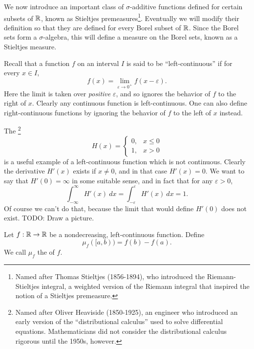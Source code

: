 \begin{subsec}
We now introduce an important class of $\sigma$-additive functions defined for certain subsets of $\mathbb{R}$, known as Stieltjes premeasures\footnote{Named after Thomas Stieltjes (1856-1894), who introduced the Riemann-Stieltjes integral, a weighted version of the Riemann integral that inspired the notion of a Stieltjes premeasure.}.
Eventually we will modify their definition so that they are defined for every Borel subset of $\mathbb{R}$.
Since the Borel sets form a $\sigma$-algebra, this will define a measure on the Borel sets, known as a Stieltjes measure.
\end{subsec}

\begin{subsec}
Recall that a function $f$ on an interval $I$ is said to be ``left-continuous'' if for every $x \in I$,
\[f(x) = \lim_{\varepsilon \to 0^+} f(x - \varepsilon).\]
Here the limit is taken over \emph{positive} $\varepsilon$, and so ignores the behavior of $f$ to the right of $x$.
Clearly any continuous function is left-continuous.
One can also define right-continuous functions by ignoring the behavior of $f$ to the left of $x$ instead.
\end{subsec}

\begin{example}
The \footnote{Named after Oliver Heaviside (1850-1925), an engineer who introduced an early version of the ``distributional calculus'' used to solve differential equations. Mathematicians did not consider the distributional calculus rigorous until the 1950s, however.}
$$H(x) = \begin{cases}
0, & x \leq 0\\
1, & x > 0
\end{cases}$$
is a useful example of a left-continuous function which is not continuous.
Clearly the derivative $H'(x)$ exists if $x \neq 0$, and in that case $H'(x) = 0$.
We want to say that $H'(0) = \infty$ in some suitable sense, and in fact that for any $\varepsilon > 0$,
\[\int_{-\infty}^{\infty} H'(x)~dx = \int_{-\varepsilon}^{\varepsilon} H'(x)~dx = 1.\]
Of course we can't do that, because the limit that would define $H'(0)$ does not exist.
TODO: Draw a picture.
\end{example}

\begin{definition}
Let $f: \mathbb{R} \to \mathbb{R}$ be a nondecreasing, left-continuous function.
Define
\[\mu_f([a, b)) = f(b) - f(a).\]
We call $\mu_f$ the  of $f$.
\end{definition}

